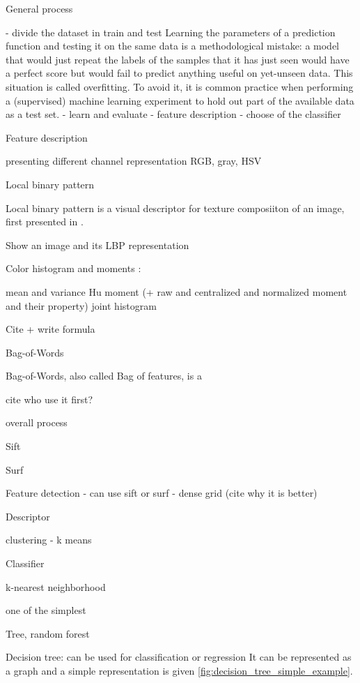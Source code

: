 General process

- divide the dataset in train and test
Learning the parameters of a prediction function and testing it on the same data is a methodological mistake: a model that would just repeat the labels of the samples that it has just seen would have a perfect score but would fail to predict anything useful on yet-unseen data. This situation is called overfitting. To avoid it, it is common practice when performing a (supervised) machine learning experiment to hold out part of the available data as a test set.
- learn and evaluate
- feature description
- choose of the classifier

Feature description

presenting different channel representation
RGB, gray, HSV

Local binary pattern

Local binary pattern is a visual descriptor for texture composiiton of an image, first presented in .

Show an image and its LBP representation



Color histogram and moments :

mean and variance
Hu moment (+ raw and centralized and normalized moment and their property)
joint histogram

Cite + write formula

Bag-of-Words

Bag-of-Words, also called Bag of features, is a 

cite who use it first?

overall process

Sift

Surf

Feature detection
- can use sift or surf
- dense grid (cite why it is better)

Descriptor

clustering
- k means

Classifier

k-nearest neighborhood

one of the simplest

Tree, random forest

Decision tree: can be used for classification or regression
It can be represented as a graph and a simple representation is given \ref{fig:decision_tree_simple_example}.

